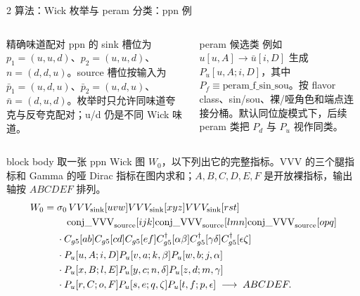 \documentclass[aspectratio=169,UTF8,fontset=fandol]{ctexbeamer}
\begin{document}
\begin{frame}{2 算法：Wick 枚举与 peram 分类：ppn 例}
\small
\begin{columns}[T,onlytextwidth]
\begin{block}{精确味道配对}
ppn 的 sink 槽位为 \(p_1=(u,u,d)\)、\(p_2=(u,u,d)\)、\(n=(d,d,u)\)。source 槽位按输入为 \(\bar p_1=(u,d,u)\)、\(\bar p_2=(u,d,u)\)、\(\bar n=(d,u,d)\)。枚举时只允许同味道夸克与反夸克配对；u/d 仍是不同 Wick 味道。
\end{block}
\begin{block}{peram 候选类}
例如 \(u[u,A]\to\bar u[i,D]\) 生成 \(P_u[u,A;i,D]\)，其中 \(P_f\equiv\mathrm{peram\_f\_sin\_sou}\)。按 flavor class、sin/sou、裸/哑角色和端点连接分桶。默认同位旋模式下，后续 peram 类把 \(P_d\) 与 \(P_u\) 视作同类。
\end{block}
\end{columns}
\vspace{0.15em}
\begin{beamercolorbox}[sep=0.2em,wd=\linewidth]{block body}
\scriptsize
取一张 ppn Wick 图 \(W_0\)，以下列出它的完整指标。VVV 的三个腿指标和 Gamma 的哑 Dirac 指标在图内求和；\(A,B,C,D,E,F\) 是开放裸指标，输出轴按 \(ABCDEF\) 排列。
{\setlength{\jot}{1pt}
\[
\begin{aligned}
W_0={}&\sigma_0\,
VVV_{\rm sink}[uvw]VVV_{\rm sink}[xyz]VVV_{\rm sink}[rst]\\
&\quad\mathrm{conj\_VVV}_{\rm source}[ijk]\mathrm{conj\_VVV}_{\rm source}[lmn]\mathrm{conj\_VVV}_{\rm source}[opq]\\
&\cdot C_{g5}[ab]C_{g5}[cd]C_{g5}[ef]
 C_{g5}^{\dagger}[\alpha\beta]C_{g5}^{\dagger}[\gamma\delta]C_{g5}^{\dagger}[\epsilon\zeta]\\
&\cdot P_u[u,A;i,D]P_u[v,a;k,\beta]P_u[w,b;j,\alpha]\\
&\cdot P_u[x,B;l,E]P_u[y,c;n,\delta]P_u[z,d;m,\gamma]\\
&\cdot P_u[r,C;o,F]P_u[s,e;q,\zeta]P_u[t,f;p,\epsilon]\;\longrightarrow\;ABCDEF .
\end{aligned}
\]
}
\end{beamercolorbox}
\end{frame}
\end{document}
